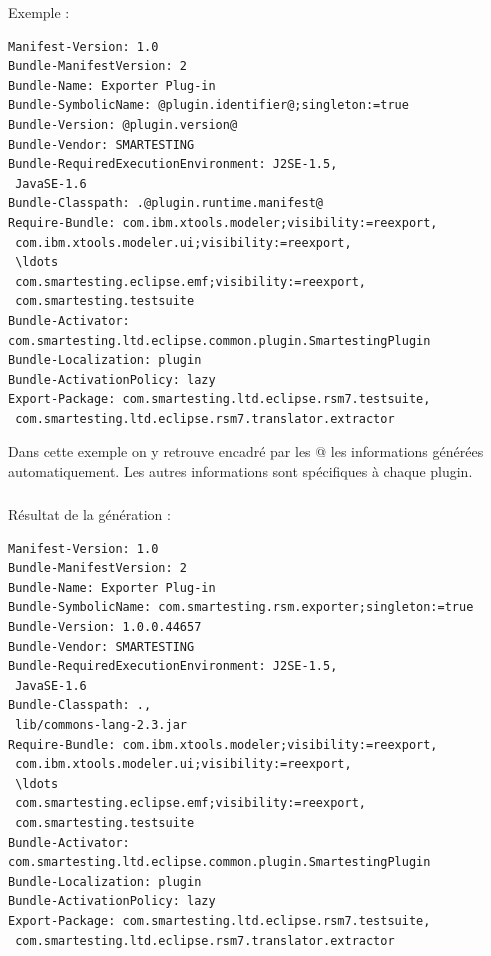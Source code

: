 Exemple :
\tiny
\begin{verbatim}
Manifest-Version: 1.0
Bundle-ManifestVersion: 2
Bundle-Name: Exporter Plug-in
Bundle-SymbolicName: @plugin.identifier@;singleton:=true
Bundle-Version: @plugin.version@
Bundle-Vendor: SMARTESTING
Bundle-RequiredExecutionEnvironment: J2SE-1.5,
 JavaSE-1.6
Bundle-Classpath: .@plugin.runtime.manifest@
Require-Bundle: com.ibm.xtools.modeler;visibility:=reexport,
 com.ibm.xtools.modeler.ui;visibility:=reexport,
 \ldots
 com.smartesting.eclipse.emf;visibility:=reexport,
 com.smartesting.testsuite
Bundle-Activator: com.smartesting.ltd.eclipse.common.plugin.SmartestingPlugin
Bundle-Localization: plugin
Bundle-ActivationPolicy: lazy
Export-Package: com.smartesting.ltd.eclipse.rsm7.testsuite,
 com.smartesting.ltd.eclipse.rsm7.translator.extractor
\end{verbatim}
\normalsize

Dans cette exemple on y retrouve encadré par les @ les informations générées automatiquement.
Les autres informations sont spécifiques à chaque plugin.

\subparagraph*{}
Résultat de la génération :
\tiny
\begin{verbatim}
Manifest-Version: 1.0
Bundle-ManifestVersion: 2
Bundle-Name: Exporter Plug-in
Bundle-SymbolicName: com.smartesting.rsm.exporter;singleton:=true
Bundle-Version: 1.0.0.44657
Bundle-Vendor: SMARTESTING
Bundle-RequiredExecutionEnvironment: J2SE-1.5,
 JavaSE-1.6
Bundle-Classpath: .,
 lib/commons-lang-2.3.jar
Require-Bundle: com.ibm.xtools.modeler;visibility:=reexport,
 com.ibm.xtools.modeler.ui;visibility:=reexport,
 \ldots
 com.smartesting.eclipse.emf;visibility:=reexport,
 com.smartesting.testsuite
Bundle-Activator: com.smartesting.ltd.eclipse.common.plugin.SmartestingPlugin
Bundle-Localization: plugin
Bundle-ActivationPolicy: lazy
Export-Package: com.smartesting.ltd.eclipse.rsm7.testsuite,
 com.smartesting.ltd.eclipse.rsm7.translator.extractor
\end{verbatim}
\normalsize
